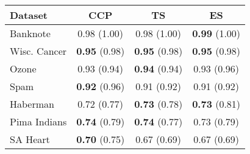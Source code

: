 \begin{tabular}{lccc}
\toprule
Dataset & CCP & TS & ES \\
\midrule
Banknote & 0.98 (1.00) & 0.98 (1.00) & \textbf{0.99} (1.00) \\
Wisc. Cancer & \textbf{0.95} (0.98) & \textbf{0.95} (0.98) & \textbf{0.95} (0.98) \\
Ozone & 0.93 (0.94) & \textbf{0.94} (0.94) & 0.93 (0.96) \\
Spam & \textbf{0.92} (0.96) & 0.91 (0.92) & 0.91 (0.92) \\
Haberman & 0.72 (0.77) & \textbf{0.73} (0.78) & \textbf{0.73} (0.81) \\
Pima Indians & \textbf{0.74} (0.79) & \textbf{0.74} (0.77) & 0.73 (0.79) \\
SA Heart & \textbf{0.70} (0.75) & 0.67 (0.69) & 0.67 (0.69) \\
\bottomrule
\end{tabular}